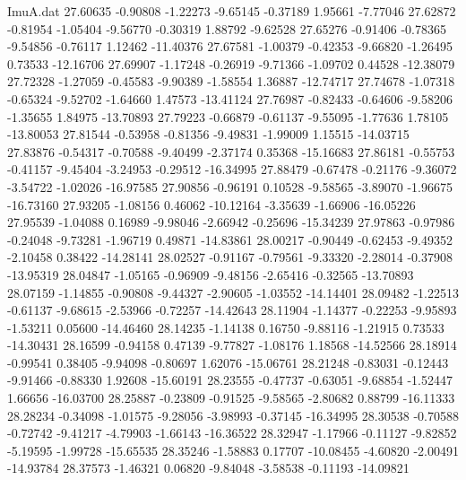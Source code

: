 \begin{filecontents}{ImuA.dat}
  27.60635   -0.90808   -1.22273   -9.65145   -0.37189    1.95661   -7.77046
  27.62872   -0.81954   -1.05404   -9.56770   -0.30319    1.88792   -9.62528
  27.65276   -0.91406   -0.78365   -9.54856   -0.76117    1.12462  -11.40376
  27.67581   -1.00379   -0.42353   -9.66820   -1.26495    0.73533  -12.16706
  27.69907   -1.17248   -0.26919   -9.71366   -1.09702    0.44528  -12.38079
  27.72328   -1.27059   -0.45583   -9.90389   -1.58554    1.36887  -12.74717
  27.74678   -1.07318   -0.65324   -9.52702   -1.64660    1.47573  -13.41124
  27.76987   -0.82433   -0.64606   -9.58206   -1.35655    1.84975  -13.70893
  27.79223   -0.66879   -0.61137   -9.55095   -1.77636    1.78105  -13.80053
  27.81544   -0.53958   -0.81356   -9.49831   -1.99009    1.15515  -14.03715
  27.83876   -0.54317   -0.70588   -9.40499   -2.37174    0.35368  -15.16683
  27.86181   -0.55753   -0.41157   -9.45404   -3.24953   -0.29512  -16.34995
  27.88479   -0.67478   -0.21176   -9.36072   -3.54722   -1.02026  -16.97585
  27.90856   -0.96191    0.10528   -9.58565   -3.89070   -1.96675  -16.73160
  27.93205   -1.08156    0.46062  -10.12164   -3.35639   -1.66906  -16.05226
  27.95539   -1.04088    0.16989   -9.98046   -2.66942   -0.25696  -15.34239
  27.97863   -0.97986   -0.24048   -9.73281   -1.96719    0.49871  -14.83861
  28.00217   -0.90449   -0.62453   -9.49352   -2.10458    0.38422  -14.28141
  28.02527   -0.91167   -0.79561   -9.33320   -2.28014   -0.37908  -13.95319
  28.04847   -1.05165   -0.96909   -9.48156   -2.65416   -0.32565  -13.70893
  28.07159   -1.14855   -0.90808   -9.44327   -2.90605   -1.03552  -14.14401
  28.09482   -1.22513   -0.61137   -9.68615   -2.53966   -0.72257  -14.42643
  28.11904   -1.14377   -0.22253   -9.95893   -1.53211    0.05600  -14.46460
  28.14235   -1.14138    0.16750   -9.88116   -1.21915    0.73533  -14.30431
  28.16599   -0.94158    0.47139   -9.77827   -1.08176    1.18568  -14.52566
  28.18914   -0.99541    0.38405   -9.94098   -0.80697    1.62076  -15.06761
  28.21248   -0.83031   -0.12443   -9.91466   -0.88330    1.92608  -15.60191
  28.23555   -0.47737   -0.63051   -9.68854   -1.52447    1.66656  -16.03700
  28.25887   -0.23809   -0.91525   -9.58565   -2.80682    0.88799  -16.11333
  28.28234   -0.34098   -1.01575   -9.28056   -3.98993   -0.37145  -16.34995
  28.30538   -0.70588   -0.72742   -9.41217   -4.79903   -1.66143  -16.36522
  28.32947   -1.17966   -0.11127   -9.82852   -5.19595   -1.99728  -15.65535
  28.35246   -1.58883    0.17707  -10.08455   -4.60820   -2.00491  -14.93784
  28.37573   -1.46321    0.06820   -9.84048   -3.58538   -0.11193  -14.09821

\end{filecontents}

